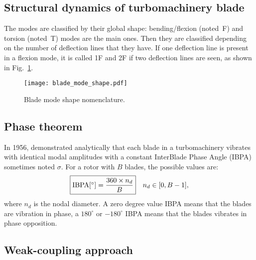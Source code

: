 \subsection{Structural dynamics of turbomachinery blade}
\label{sub:structural_dynamics_of_turbomachinery_blade}

The modes are classified by their global shape: 
bending/flexion (noted~F) and torsion (noted~T) 
modes are the main ones. Then they are classified
depending on the number of deflection lines that they
have. If one deflection line is present in a flexion 
mode, it is called 1F and 2F if two deflection lines are
seen, as shown in Fig.~\ref{fig:blade_mode_shape}.
\begin{figure}[htp]
  \centering
  \texttt{[image: blade\_mode\_shape.pdf]}
  \caption{Blade mode shape nomenclature.}
  \label{fig:blade_mode_shape}
\end{figure}

\subsection{Phase theorem}
\label{sub:lane_theorem}

In 1956, \citet{Lane1956} 
demonstrated analytically that each blade in a turbomachinery vibrates with
identical modal amplitudes with a constant InterBlade
Phase Angle (IBPA) sometimes noted $\sigma$. For a rotor with $B$ blades,
the possible values are:
\begin{equation}
    \fbox{$\textrm{IBPA} [^\circ] = \displaystyle \frac{360 \times n_d}{B}$} \quad n_d \in [0, B-1],
\end{equation}
where $n_d$ is the nodal diameter.
A zero degree value IBPA means that the blades are vibration in phase, a $180^\circ$ or
$-180^\circ$ IBPA means that the blades vibrates in phase opposition.

\subsection{Weak-coupling approach}
\label{sub:weak_coupling_approach}

